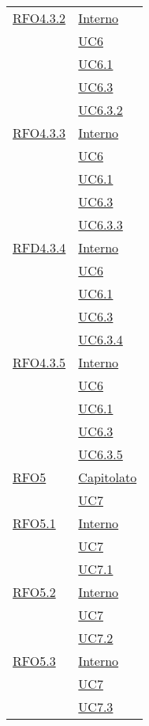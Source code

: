 \begin{longtable}{|>{\centering}m{5cm}|m{5cm}<{\centering}|}
\hyperlink{RFO4.3.2}{RFO4.3.2} 
& \hyperlink{Interno}{Interno}\\
& \hyperref[UC6]{UC6}\\
& \hyperref[UC6.1]{UC6.1}\\
& \hyperref[UC6.3]{UC6.3}\\
& \hyperref[UC6.3.2]{UC6.3.2}\\ \hline

\hyperlink{RFO4.3.3}{RFO4.3.3} 
& \hyperlink{Interno}{Interno}\\
& \hyperref[UC6]{UC6}\\
& \hyperref[UC6.1]{UC6.1}\\
& \hyperref[UC6.3]{UC6.3}\\
& \hyperref[UC6.3.3]{UC6.3.3}\\ \hline

\hyperlink{RFD4.3.4}{RFD4.3.4} 
& \hyperlink{Interno}{Interno}\\
& \hyperref[UC6]{UC6}\\
& \hyperref[UC6.1]{UC6.1}\\
& \hyperref[UC6.3]{UC6.3}\\
& \hyperref[UC6.3.4]{UC6.3.4}\\ \hline

\hyperlink{RFO4.3.5}{RFO4.3.5} 
& \hyperlink{Interno}{Interno}\\
& \hyperref[UC6]{UC6}\\
& \hyperref[UC6.1]{UC6.1}\\
& \hyperref[UC6.3]{UC6.3}\\
& \hyperref[UC6.3.5]{UC6.3.5}\\ \hline

\hyperlink{RFO5}{RFO5} 
& \hyperlink{Capitolato}{Capitolato}\\
& \hyperref[UC7]{UC7}\\ \hline

\hyperlink{RFO5.1}{RFO5.1} 
& \hyperlink{Interno}{Interno}\\
& \hyperref[UC7]{UC7}\\
& \hyperref[UC7.1]{UC7.1}\\ \hline

\hyperlink{RFO5.2}{RFO5.2} 
& \hyperlink{Interno}{Interno}\\
& \hyperref[UC7]{UC7}\\
& \hyperref[UC7.2]{UC7.2}\\ \hline

\hyperlink{RFO5.3}{RFO5.3} 
& \hyperlink{Interno}{Interno}\\
& \hyperref[UC7]{UC7}\\
& \hyperref[UC7.3]{UC7.3}\\ \hline


\end{longtable}
